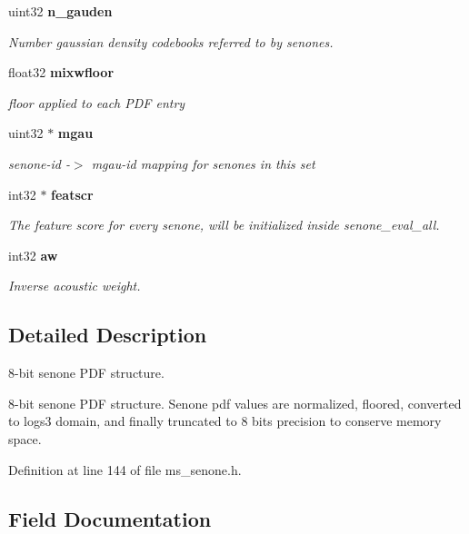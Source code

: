 \begin{DoxyCompactItemize}
\mbox{\label{structsenone__t_a71cf7b41b2334216944380296c03c99a}} 
uint32 \textbf{ n\+\_\+gauden}
\begin{DoxyCompactList}\small\item\em Number gaussian density codebooks referred to by senones. \end{DoxyCompactList}\item 
\mbox{\label{structsenone__t_af3f77493f07dd1740084ea8dc4541cb1}} 
float32 \textbf{ mixwfloor}
\begin{DoxyCompactList}\small\item\em floor applied to each P\+DF entry \end{DoxyCompactList}\item 
\mbox{\label{structsenone__t_a5f0eee5a11e7c10b20e0cce10305edfc}} 
uint32 $\ast$ \textbf{ mgau}
\begin{DoxyCompactList}\small\item\em senone-\/id -\/$>$ mgau-\/id mapping for senones in this set \end{DoxyCompactList}\item 
\mbox{\label{structsenone__t_a58af20c262d9d633f53c8c1c7e60459e}} 
int32 $\ast$ \textbf{ featscr}
\begin{DoxyCompactList}\small\item\em The feature score for every senone, will be initialized inside senone\+\_\+eval\+\_\+all. \end{DoxyCompactList}\item 
\mbox{\label{structsenone__t_ad9b17f6aecf056fcea0eaaab0c7d35ca}} 
int32 \textbf{ aw}
\begin{DoxyCompactList}\small\item\em Inverse acoustic weight. \end{DoxyCompactList}\end{DoxyCompactItemize}


\subsection{Detailed Description}
8-\/bit senone P\+DF structure. 

8-\/bit senone P\+DF structure. Senone pdf values are normalized, floored, converted to logs3 domain, and finally truncated to 8 bits precision to conserve memory space. 

Definition at line 144 of file ms\+\_\+senone.\+h.



\subsection{Field Documentation}
\mbox{\label{structsenone__t_aa7e23dc8a18875bad1c1b9c322f3cad4}} 
